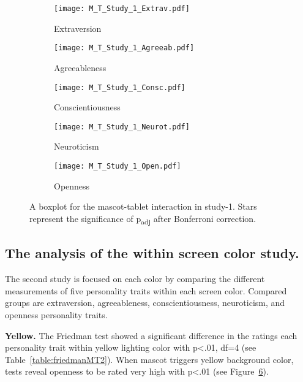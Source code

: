 \begin{figure}[hbt!]
    \centering
    \begin{subfigure}{.40\textwidth}
        \centering
        \texttt{[image: M\_T\_Study\_1\_Extrav.pdf]}
        \caption{Extraversion}
        \label{fig:sub1}
    \end{subfigure}\hfill%
    \begin{subfigure}{.40\textwidth}
        \centering
        \texttt{[image: M\_T\_Study\_1\_Agreeab.pdf]}
        \caption{Agreeableness}
        \label{fig:sub2}
    \end{subfigure}\hfill
    \begin{subfigure}{.40\textwidth}
        \centering
        \texttt{[image: M\_T\_Study\_1\_Consc.pdf]}
        \caption{Conscientiousness}
        \label{fig:sub1}
    \end{subfigure}\hfill%
    \begin{subfigure}{.40\textwidth}
        \centering
        \texttt{[image: M\_T\_Study\_1\_Neurot.pdf]}
        \caption{Neuroticism}
        \label{fig:sub1}
    \end{subfigure}\hfill%
    \begin{subfigure}{.40\textwidth}
        \centering
        \texttt{[image: M\_T\_Study\_1\_Open.pdf]}
        \caption{Openness}
        \label{fig:sub1}
    \end{subfigure}\hfill%
    \caption{A boxplot for the mascot-tablet interaction in study-1.
    Stars represent the significance of p\textsubscript{adj} after Bonferroni correction.}
    \label{fig:MT1}
\end{figure}
\subsection{The analysis of the within screen color study.}
\label{subsec:MTstudy2}
The second study is focused on each color by comparing the different measurements of five
personality traits within each screen color.
Compared groups are extraversion, agreeableness, conscientiousness, neuroticism, and openness personality traits.

\par\textbf{Yellow.}
The Friedman test showed a significant difference in the ratings each personality trait
within yellow lighting color with p<.01, df=4 (see Table~\ref{table:friedmanMT2}).
When mascot triggers yellow background color, tests reveal openness
to be rated very high with p<.01 (see Figure~\ref{fig:MT1}).

